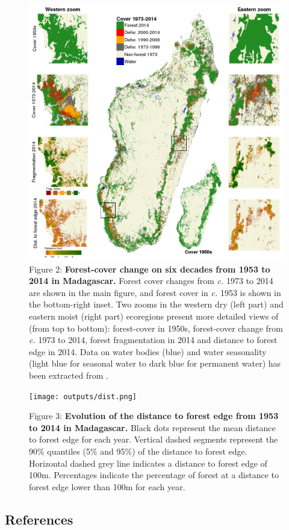 \documentclass[]{article}
\begin{document}
\begin{figure}
\centering
\includegraphics{outputs/fig_fcc_highres.png}
\caption{Figure 2: \textbf{Forest-cover change on six decades from 1953
to 2014 in Madagascar.} Forest cover changes from \emph{c.} 1973 to 2014
are shown in the main figure, and forest cover in \emph{c.} 1953 is
shown in the bottom-right inset. Two zooms in the western dry (left
part) and eastern moist (right part) ecoregions present more detailed
views of (from top to bottom): forest-cover in 1950s, forest-cover
change from \emph{c.} 1973 to 2014, forest fragmentation in 2014 and
distance to forest edge in 2014. Data on water bodies (blue) and water
seasonality (light blue for seasonal water to dark blue for permanent
water) has been extracted from \citet{Pekel2016}.}
\end{figure}

\begin{figure}
\centering
\texttt{[image: outputs/dist.png]}
\caption{Figure 3: \textbf{Evolution of the distance to forest edge from
1953 to 2014 in Madagascar.} Black dots represent the mean distance to
forest edge for each year. Vertical dashed segments represent the 90\%
quantiles (5\% and 95\%) of the distance to forest edge. Horizontal
dashed grey line indicates a distance to forest edge of 100m.
Percentages indicate the percentage of forest at a distance to forest
edge lower than 100m for each year.}
\end{figure}

\hypertarget{references}{%
\subsection{References}\label{references}}


\end{document}
